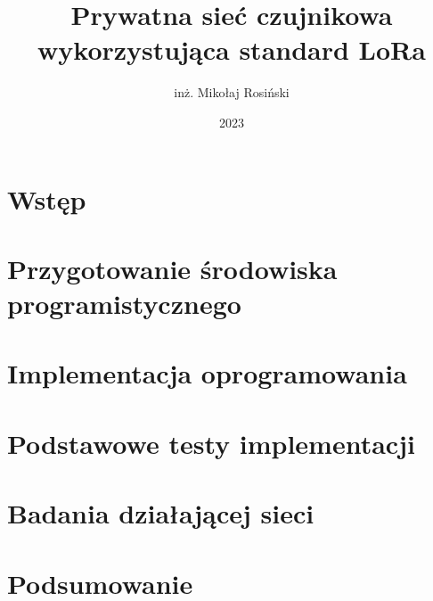 \documentclass[thesis=mgr,faculty=ee]{EE-dyplom}
\title{Prywatna sieć czujnikowa wykorzystująca standard LoRa}
\author{inż. Mikołaj Rosiński}
\date{2023}
\begin{document}
\frontpages

\chapter{Wstęp}


\chapter{Przygotowanie środowiska programistycznego\label{ch:development}}


\chapter{Implementacja oprogramowania\label{ch:implementation}}


\chapter{Podstawowe testy implementacji\label{ch:testing}}


\chapter{Badania działającej sieci\label{ch:research}}


\chapter{Podsumowanie\label{ch:summary}}


\bibliografia

\acronymslist
\listoffigures
\listoftables
\end{document}
